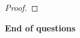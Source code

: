 \documentclass[11pt]{article}
\begin{document}
\begin{enumerate}[label=\textbf{Q\arabic*.}]
\begin{proof}
\end{proof}


	\end{enumerate}

\vspace{1cm}

 \textbf{End of questions}
\end{document}
